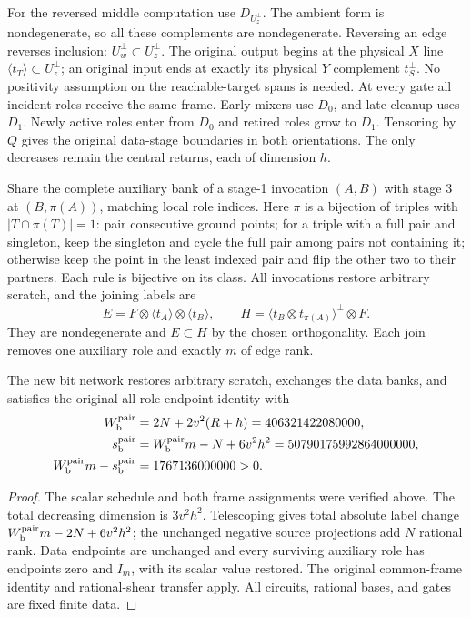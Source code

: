 For the reversed middle computation use $D_{U_z^\perp}$. The ambient form
is nondegenerate, so all these complements are nondegenerate. Reversing an
edge reverses inclusion: $U_w^\perp\subset U_z^\perp$.
The original output begins at the physical $X$ line
$\langle t_T\rangle\subset U_z^\perp$; an original input ends at exactly
its physical $Y$ complement $t_S^\perp$. No positivity assumption on the
reachable-target spans is needed. At every gate all incident roles receive
the same frame. Early mixers use $D_0$, and late cleanup uses $D_1$.
Newly active roles enter from $D_0$ and retired roles grow to $D_1$.
Tensoring by $Q$ gives the original data-stage boundaries in both orientations.
The only decreases remain the central returns, each of dimension $h$.

Share the complete auxiliary bank of a stage-1 invocation $(A,B)$ with stage 3
at $(B,\pi(A))$, matching local role indices. Here $\pi$ is a bijection of
triples with $|T\cap\pi(T)|=1$: pair consecutive ground points; for a triple
with a full pair and singleton, keep the singleton and cycle the full pair
among pairs not containing it; otherwise keep the point in the least indexed
pair and flip the other two to their partners. Each rule is bijective on its
class. All invocations restore arbitrary scratch, and the joining labels are
\[
 E=F\otimes\langle t_A\rangle\otimes\langle t_B\rangle,
 \qquad H=\langle t_B\otimes t_{\pi(A)}\rangle^\perp\otimes F.
\]
They are nondegenerate and $E\subset H$ by the chosen orthogonality.
Each join removes one auxiliary role and exactly $m$ of edge rank.

\begin{proposition}\label{prop:paired-bit-interface}
The new bit network restores arbitrary scratch, exchanges the data banks,
and satisfies the original all-role endpoint identity with
\begin{align*}
 W_{\rm b}^{\rm pair}&=2N+2v^2(R+h)=406321422080000,\\
 s_{\rm b}^{\rm pair}&=W_{\rm b}^{\rm pair}m-N+6v^2h^2
                         =50790175992864000000,\\
 W_{\rm b}^{\rm pair}m-s_{\rm b}^{\rm pair}&=1767136000000>0.
\end{align*}
\end{proposition}
\begin{proof}
The scalar schedule and both frame assignments were verified above. The total
decreasing dimension is $3v^2h^2$. Telescoping gives total absolute label change
$W_{\rm b}^{\rm pair}m-2N+6v^2h^2$; the unchanged negative source projections
add $N$ rational rank. Data endpoints are unchanged and every surviving
auxiliary role has endpoints zero and $I_m$, with its scalar value restored.
The original common-frame identity and rational-shear transfer apply. All
circuits, rational bases, and gates are fixed finite data.
\end{proof}

